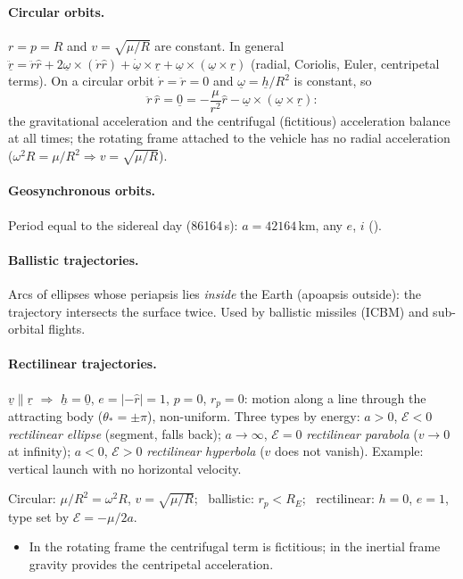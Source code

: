 \paragraph{Circular orbits.} $r=p=R$ and $v=\sqrt{\mu/R}$ are constant. In general
$\ddot{\underline r}=\ddot r\hat r+2\underline\omega\times(\dot r\hat r)+\dot{\underline\omega}\times\underline r+\underline\omega\times(\underline\omega\times\underline r)$
(radial, Coriolis, Euler, centripetal terms). On a circular orbit $\dot r=\ddot r=0$ and $\underline\omega=\underline h/R^2$ is constant, so
\begin{equation}
\ddot r\,\hat r=\underline 0=-\frac{\mu}{r^2}\hat r-\underline\omega\times(\underline\omega\times\underline r):
\end{equation}
the gravitational acceleration and the centrifugal (fictitious) acceleration balance at all times; the rotating frame attached to the
vehicle has no radial acceleration ($\omega^2R=\mu/R^2\Rightarrow v=\sqrt{\mu/R}$).

\paragraph{Geosynchronous orbits.} Period equal to the sidereal day (86164\,s): $a=42164$\,km, any $e$, $i$ ().

\paragraph{Ballistic trajectories.} Arcs of ellipses whose periapsis lies \emph{inside} the Earth (apoapsis outside): the trajectory intersects
the surface twice. Used by ballistic missiles (ICBM) and sub-orbital flights.

\paragraph{Rectilinear trajectories.} $\underline v\parallel\underline r$ $\Rightarrow$ $\underline h=\underline 0$, $e=|-\hat r|=1$, $p=0$, $r_p=0$: motion along a line through the
attracting body ($\theta_*=\pm\pi$), non-uniform. Three types by energy: $a>0$, $\mathcal E<0$ \emph{rectilinear ellipse} (segment, falls back);
$a\to\infty$, $\mathcal E=0$ \emph{rectilinear parabola} ($v\to0$ at infinity); $a<0$, $\mathcal E>0$ \emph{rectilinear hyperbola} ($v$ does not vanish).
Example: vertical launch with no horizontal velocity.
\begin{keyf}
Circular: $\mu/R^2=\omega^2R$, $v=\sqrt{\mu/R}$; \ ballistic: $r_p<R_E$; \ rectilinear: $h=0$, $e=1$, type set by $\mathcal E=-\mu/2a$.
\end{keyf}
\pitfalls
\begin{itemize}
\item In the rotating frame the centrifugal term is fictitious; in the inertial frame gravity provides the centripetal acceleration.
\end{itemize}

